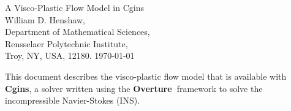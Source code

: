 \documentclass[11pt]{article}
\newcommand{\Overture}{{\bf Over\-ture\ }}
\begin{document}


\def\comma  {~~~,~~}
\newcommand{\uvd}{\mathbf{U}}
\def\ud     {{    U}}
\def\pd     {{    P}}
\def\calo{{\cal O}}

\newcommand{\mbar}{\bar{m}}
\newcommand{\Rbar}{\bar{R}}
\newcommand{\Ru}{R_u}         %
\newcommand{\Div}{\grad\cdot}
\newcommand{\tauv}{\boldsymbol{\tau}}
\newcommand{\thetav}{\boldsymbol{\theta}}

\newcommand{\Omegav}{\boldsymbol{\Omega}}
\newcommand{\omegav}{\boldsymbol{\omega}}
\newcommand{\sigmav}{\boldsymbol{\sigma}}
\newcommand{\cm}{{\rm cm}}
\newcommand{\Jc}{{\mathcal J}}

\newcommand{\sumi}{\sum_{i=1}^n}
\newcommand{\dt}{{\Delta t}}

\def\ff {\tt} %



\newcommand{\figWidth}{}
\newcommand{\clipfig}{}

\newcommand{\bogus}[1]{}  %

\vspace{5\baselineskip}
\begin{flushleft}
{\Large
A Visco-Plastic Flow Model in Cgins \\
}
\vspace{2\baselineskip}
William D. Henshaw,\\
Department of Mathematical Sciences, \\
Rensselaer Polytechnic Institute, \\
Troy, NY, USA, 12180.
\vspace{\baselineskip}
\today\\
\vspace{\baselineskip}

\vspace{4\baselineskip}


This document describes the visco-plastic flow model that is available with 
{\bf Cgins}, a solver written using the \Overture framework
to solve the incompressible Navier-Stokes (INS).  

\end{flushleft}
\end{document}
